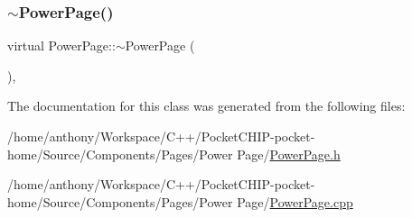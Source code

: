 \mbox{\label{classPowerPage_ad02f6913d06fed786a02b79f124dd6d5}} 
\subsubsection{\texorpdfstring{$\sim$\+Power\+Page()}{~PowerPage()}}
{\footnotesize\ttfamily virtual Power\+Page\+::$\sim$\+Power\+Page (\begin{DoxyParamCaption}{ }\end{DoxyParamCaption})\hspace{0.3cm}{\ttfamily [inline]}, {\ttfamily [virtual]}}



The documentation for this class was generated from the following files\+:\begin{DoxyCompactItemize}
\item 
/home/anthony/\+Workspace/\+C++/\+Pocket\+C\+H\+I\+P-\/pocket-\/home/\+Source/\+Components/\+Pages/\+Power Page/\mbox{\hyperlink{PowerPage_8h}{Power\+Page.\+h}}\item 
/home/anthony/\+Workspace/\+C++/\+Pocket\+C\+H\+I\+P-\/pocket-\/home/\+Source/\+Components/\+Pages/\+Power Page/\mbox{\hyperlink{PowerPage_8cpp}{Power\+Page.\+cpp}}\end{DoxyCompactItemize}
